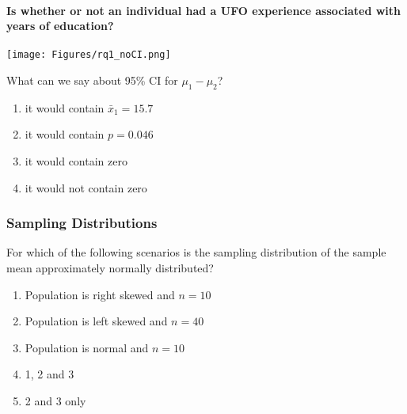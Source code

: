 \begin{frame}
\framesubtitle{Is whether or not an individual had a UFO experience associated with years of education?}
\texttt{[image: Figures/rq1\_noCI.png]}\\
\vskip10pt
\begin{clicker}{What can we say about 95\% CI for $\mu_1-\mu_2$?}
\begin{enumerate}
    \item
    it would contain $\bar{x}_1=15.7$
    \item
    it would contain $p=0.046$
    \item
    it would contain zero
    \item
    it would not contain zero
\end{enumerate}
\end{clicker}
\end{frame}

\begin{frame}
\frametitle{Sampling Distributions}
\begin{clicker}
{For which of the following scenarios is the sampling distribution of the sample mean approximately normally distributed?}
\begin{enumerate}
    \item
    Population is right skewed and $n = 10$
    \item
    Population is left skewed and $n = 40$
    \item
    Population is normal and $n = 10$
    \item
    1, 2 and 3
    \item
    2 and 3 only
\end{enumerate}
\end{clicker}
\end{frame}

